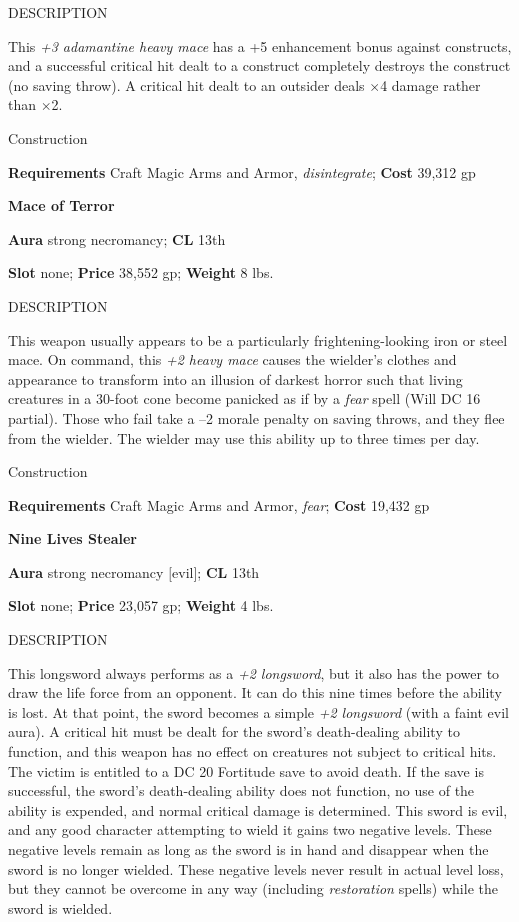 DESCRIPTION
				
This \textit{+3 adamantine heavy mace} has a +5 enhancement bonus against constructs, and a successful critical hit dealt to a construct completely destroys the construct (no saving throw). A critical hit dealt to an outsider deals \mbox{$\times$}4 damage rather than \mbox{$\times$}2. 
				
Construction
				
\textbf{Requirements} Craft Magic Arms and Armor, \textit{disintegrate}; \textbf{Cost }39,312 gp
				
\textbf{Mace of Terror}
				
\textbf{Aura} strong necromancy;\textbf{ CL }13th
				
\textbf{Slot} none; \textbf{Price} 38,552 gp; \textbf{Weight} 8 lbs.
				
DESCRIPTION
				
This weapon usually appears to be a particularly frightening-looking iron or steel mace. On command, this \textit{+2 heavy mace} causes the wielder's clothes and appearance to transform into an illusion of darkest horror such that living creatures in a 30-foot cone become panicked as if by a \textit{fear} spell (Will DC 16 partial). Those who fail take a --2 morale penalty on saving throws, and they flee from the wielder. The wielder may use this ability up to three times per day. 
				
Construction
				
\textbf{Requirements} Craft Magic Arms and Armor, \textit{fear}; \textbf{Cost }19,432 gp
				
\textbf{Nine Lives Stealer}
				
\textbf{Aura} strong necromancy \mbox{$[$}evil\mbox{$]$}; \textbf{CL} 13th
				
\textbf{Slot} none; \textbf{Price} 23,057 gp; \textbf{Weight} 4 lbs.
				
DESCRIPTION
				
This longsword always performs as a \textit{+2 longsword}, but it also has the power to draw the life force from an opponent. It can do this nine times before the ability is lost. At that point, the sword becomes a simple \textit{+2 longsword} (with a faint evil aura). A critical hit must be dealt for the sword's death-dealing ability to function, and this weapon has no effect on creatures not subject to critical hits. The victim is entitled to a DC 20 Fortitude save to avoid death. If the save is successful, the sword's death-dealing ability does not function, no use of the ability is expended, and normal critical damage is determined. This sword is evil, and any good character attempting to wield it gains two negative levels. These negative levels remain as long as the sword is in hand and disappear when the sword is no longer wielded. These negative levels never result in actual level loss, but they cannot be overcome in any way (including \textit{restoration} spells) while the sword is wielded. 
				
